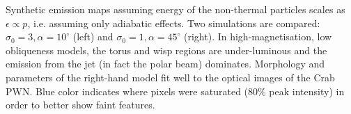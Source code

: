 \label{fig:maps} Synthetic emission maps assuming energy of the non-thermal particles scales as  $\epsilon\propto p$,  i.e. assuming only adiabatic effects.  Two simulations are compared: $\sigma_0=3,\alpha=10^\circ$ (left) and $\sigma_0=1,\alpha=45^\circ$ (right).  In high-magnetisation, low obliqueness models, the torus and wisp regions are under-luminous and the emission from the jet (in fact the polar beam) dominates.  Morphology and parameters of the right-hand model fit well to the optical images of the Crab PWN.  Blue color indicates where pixels were saturated ($80\%$ peak intensity) in order to better show faint features.